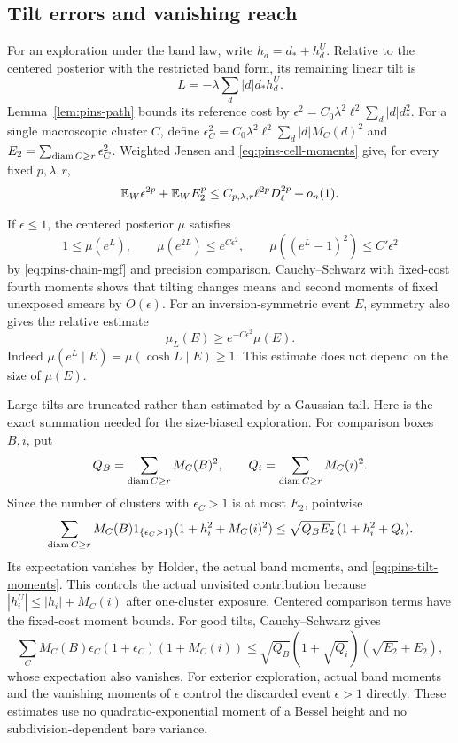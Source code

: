 \subsection{Tilt errors and vanishing reach}

For an exploration under the band law, write
\(h_d=d_*+h_d^U\). Relative to the centered posterior with
the restricted band form, its remaining linear tilt is
\[
                  L=-\lambda\sum_d|d|d_*h_d^U.
\]
Lemma~\ref{lem:pins-path} bounds its reference cost by
\(\epsilon^2=C_0\lambda^2\ell^2\sum_d|d|d_*^2\).
For a single macroscopic cluster \(C\), define
\(\epsilon_C^2=C_0\lambda^2\ell^2\sum_d|d|M_C(d)^2\)
and \(E_2=\sum_{\operatorname{diam} C\ge r}\epsilon_C^2\).
Weighted Jensen and \eqref{eq:pins-cell-moments} give, for
every fixed \(p,\lambda,r\),
\begin{equation}
       \mathbb E_W\epsilon^{2p}+\mathbb E_WE_2^p
       \le C_{p,\lambda,r}\ell^{2p}D_\ell^{2p}+o_n(1).
 \label{eq:pins-tilt-moments}
\end{equation}

If \(\epsilon\le1\), the centered posterior \(\mu\) satisfies
\[
 1\le\mu(e^L),\qquad
 \mu(e^{2L})\le e^{C\epsilon^2},\qquad
 \mu((e^L-1)^2)\le C'\epsilon^2
\]
by \eqref{eq:pins-chain-mgf} and precision comparison.
Cauchy--Schwarz with fixed-cost fourth moments shows that
tilting changes means and second moments of fixed unexposed
smears by \(O(\epsilon)\). For an inversion-symmetric event
\(E\), symmetry also gives the relative estimate
\begin{equation}
       \mu_L(E)\ge e^{-C\epsilon^2}\mu(E).
 \label{eq:pins-relative-tilt}
\end{equation}
Indeed \(\mu(e^L\mid E)=\mu(\cosh L\mid E)\ge1\).
This estimate does not depend on the size of \(\mu(E)\).

Large tilts are truncated rather than estimated by a Gaussian
tail. Here is the exact summation needed for the size-biased
exploration. For comparison boxes \(B,i\), put
\[
 Q_B=\sum_{\operatorname{diam} C\ge r}M_C(B)^2,\qquad
 Q_i=\sum_{\operatorname{diam} C\ge r}M_C(i)^2.
\]
Since the number of clusters with \(\epsilon_C>1\) is at most
\(E_2\), pointwise
\begin{equation}
 \sum_{\operatorname{diam} C\ge r}M_C(B)1_{\{\epsilon_C>1\}}
       (1+h_i^2+M_C(i)^2)
 \le\sqrt{Q_BE_2}\,(1+h_i^2+Q_i).
 \label{eq:pins-bad-tilts}
\end{equation}
Its expectation vanishes by Holder, the actual band moments,
and \eqref{eq:pins-tilt-moments}. This controls the actual
unvisited contribution because
\(|h_i^U|\le|h_i|+M_C(i)\) after one-cluster exposure.
Centered comparison terms have the fixed-cost moment bounds.
For good tilts, Cauchy--Schwarz gives
\[
 \sum_C M_C(B)\epsilon_C(1+\epsilon_C)(1+M_C(i))
 \le\sqrt{Q_B}(1+\sqrt{Q_i})(\sqrt{E_2}+E_2),
\]
whose expectation also vanishes. For exterior exploration,
actual band moments and the vanishing moments of \(\epsilon\)
control the discarded event \(\epsilon>1\) directly.
These estimates use no quadratic-exponential moment of a
Bessel height and no subdivision-dependent bare variance.

